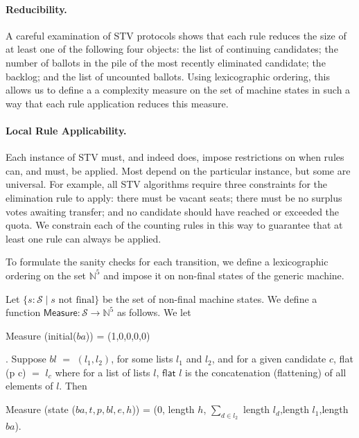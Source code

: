 \documentclass{llncs}
\begin{document}
\paragraph{Reducibility.} 
A careful examination of STV protocols shows that each rule
reduces the size of at least one of the following four
objects: the list of continuing candidates; the number of 
ballots in the pile of the most recently eliminated candidate;  the
backlog; and the list of uncounted ballots. Using lexicographic
ordering, this allows us to define a 
a complexity measure on the set of
machine states in such a way that each rule application reduces this
measure. 

\paragraph{Local Rule Applicability.}
Each instance of STV must, and indeed does, impose 
restrictions on when rules can, and must, be applied. Most
depend on the particular instance, but some
are universal. For example, all STV
algorithms require three constraints for the elimination
rule to apply: there must be vacant seats; there must be
no surplus votes awaiting transfer; and no candidate should have
reached or exceeded the quota. We constrain each of the counting
rules in this way to guarantee that at least one rule can always be
applied. 

To formulate the sanity checks for each transition, we 
define a lexicographic ordering on the set 
$\mathbb{N}^5$
and impose it on non-final states of the generic machine.   

\begin{definition} \label{defn:measure}
Let $\{s: \mathcal{S} \mid s\mbox{ not final}\}$ be the set of
non-final machine states. We define a function $\mathsf{Measure}:
\mathcal{S} \to
\mathbb{N}^5$ as follows. We let
\begin{small}\textsf{Measure} (\textsf{initial}($ba$)) =
(1,0,0,0,0)\end{small}. Suppose $bl$ $=$ $(l_{1},l_{2})$, for some
lists $l_{1}$ and $l_{2}$, and for a given candidate $c$,
\textsf{flat} (p c) $=$ $l_{c}$ where for a list of lists $l$,  $\mathsf{flat}$ $l$ is the
concatenation (flattening) of all elements of $l$. Then
\begin{small}
\begin{center}
 \textsf{Measure} (\textsf{state} ($ba,t,p,bl,e,h$)) = (0,
 \textsf{length} $h$, $\sum_{d\in l_{2}}^{}$ \textsf{length}
 $l_{d}$,\textsf{length} $l_{1}$,\textsf{length}  $ba$).
\end{center}
\end{small}
\end{definition}
\end{document}
